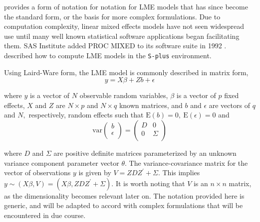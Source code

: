 \documentclass[12pt, a4paper]{report}
\theoremstyle{plain}
\theoremstyle{definition}
\theoremstyle{remark}
\begin{document}
\citet{LW82} provides a form of notation for notation for LME models that has since become the standard form, or the basis for more complex formulations. Due to computation complexity, linear mixed effects models have not seen widespread use until many well known statistical software applications began facilitating them. SAS Institute added PROC MIXED to its software suite in 1992 \citep{singer}. \citet{PB} described how to compute LME models in the \texttt{S-plus} environment.

Using Laird-Ware form, the LME model is commonly described in matrix form,
\begin{equation}
y = X\beta + Zb + \epsilon
\label{LW}
\end{equation}

\noindent where $y$ is a vector of $N$ observable random variables, $\beta$ is a vector of $p$ fixed effects, $X$ and $Z$ are $N \times p$ and $N \times q$ known matrices, and $b$ and $\epsilon$  are vectors of $q$ and $N,$ respectively, random effects such that $\mathrm{E}(b)=0, \ \mathrm{E}(\epsilon)=0$
and
\[
\mathrm{var}
\left(
              \begin{array}{c}
                b \\
                \epsilon \\
              \end{array}
            \right)
   =
\left(
         \begin{array}{cc}
           D & 0 \\
           0 & \Sigma \\
         \end{array}
       \right)
\]




where $D$ and $\Sigma$ are positive definite matrices parameterized by an unknown variance component parameter vector $ \theta.$ The variance-covariance matrix for the vector of observations $y$ is given by $V = ZDZ^{\prime}+ \Sigma.$ This implies $y \sim(X\beta, V) = (X\beta,ZDZ^{\prime}+ \Sigma)$. It is worth noting that $V$ is an $n \times n$ matrix, as the dimensionality becomes relevant later on. The notation provided here is generic, and will be adapted to accord with complex formulations that will be encountered in due course.


\end{document}
